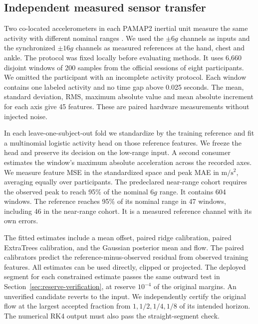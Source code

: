 \subsection{Independent measured sensor transfer}
\label{sec:pamap2}

Two co-located accelerometers in each PAMAP2 inertial unit measure
the same activity with different nominal ranges \cite{pamap2}.
We used the $\pm6g$ channels as inputs and the synchronized $\pm16g$
channels as measured references at the hand, chest and ankle.
The protocol was fixed locally before evaluating methods. It uses
6,660 disjoint windows of 200 samples from the official sessions of
eight participants. We omitted the participant with an incomplete
activity protocol. Each window contains one labeled activity and no
time gap above 0.025 seconds. The mean, standard deviation, RMS,
maximum absolute value and mean absolute increment for each axis give
45 features. These are paired hardware measurements without injected noise.

In each leave-one-subject-out fold we standardize by the training
reference and fit a multinomial logistic activity head on those
reference features. We freeze the head and preserve its decision on
the low-range input. A second consumer estimates the window's maximum
absolute acceleration across the recorded axes. We measure feature
MSE in the standardized space and peak MAE in $\mathrm{m/s^2}$,
averaging equally over participants. The predeclared near-range cohort
requires the observed peak to reach 95\% of the nominal $6g$ range.
It contains 604 windows. The reference reaches 95\% of its nominal
range in 47 windows, including 46 in the near-range cohort. It is
a measured reference channel with its own errors.

The fitted estimates include a mean offset, paired ridge calibration,
paired ExtraTrees calibration, and the Gaussian posterior mean and
flow. The paired calibrators predict the reference-minus-observed
residual from observed training features. All estimates can be used
directly, clipped or projected. The deployed segment for each
constrained estimate passes the same outward test in
Section~\ref{sec:reserve-verification}, at reserve $10^{-4}$ of the
original margins. An unverified candidate reverts to the input.
We independently certify the original flow at the largest accepted
fraction from $1,1/2,1/4,1/8$ of its intended horizon. The numerical
RK4 output must also pass the straight-segment check.

